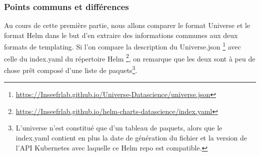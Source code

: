 \documentclass[11pt,fleqn]{book} %
\begin{document}
\subsubsection{Points communs et différences}
Au cours de cette première partie, nous allons comparer le format Universe et le format Helm dans le but d'en extraire des informations communes aux deux formats de templating. Si l'on compare la description du Universe.json \footnote{\url{https://Inseefrlab.github.io/Universe-Datascience/universe.json}} avec celle du index.yaml du répertoire Helm \footnote{\url{https://Inseefrlab.github.io/helm-charts-datascience/index.yaml}}, on remarque que les deux sont à peu de chose prêt composé d'une liste de paquets\footnote{L'universe n'est constitué que d'un tableau de paquets, alors que le index.yaml contient en plus la date de génération du fichier et la version de l'API Kubernetes avec laquelle ce Helm repo est compatible.}. \\ 
\end{document}
